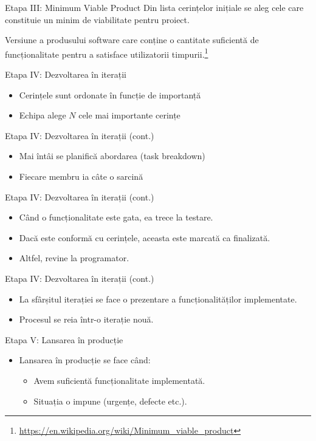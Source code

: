 \documentclass[presentation]{beamer}
\begin{document}
\begin{frame}[label={sec:org1ee4aa5}]{Etapa III: Minimum Viable Product}
Din lista cerințelor inițiale se aleg cele care constituie un minim de viabilitate pentru proiect.
\begin{definition}
Versiune a produsului software care conține o cantitate suficientă de funcționalitate pentru a satisface utilizatorii timpurii.\footnote{\url{https://en.wikipedia.org/wiki/Minimum\_viable\_product}}
\end{definition}
\end{frame}
\begin{frame}[label={sec:org7b1ed11}]{Etapa IV: Dezvoltarea în iterații}
\begin{itemize}
\item Cerințele sunt ordonate în funcție de importanță
\item Echipa alege \(N\) cele mai importante cerințe
\end{itemize}
\end{frame}
\begin{frame}[label={sec:org62a3eb6}]{Etapa IV: Dezvoltarea în iterații (cont.)}
\begin{itemize}
\item Mai întâi se planifică abordarea (task breakdown)
\item Fiecare membru ia câte o sarcină
\end{itemize}
\end{frame}
\begin{frame}[label={sec:orgff76f06}]{Etapa IV: Dezvoltarea în iterații (cont.)}
\begin{itemize}
\item Când o funcționalitate este gata, ea trece la testare.
\item Dacă este conformă cu cerințele, aceasta este marcată ca finalizată.
\item Altfel, revine la programator.
\end{itemize}
\end{frame}
\begin{frame}[label={sec:org2d982fe}]{Etapa IV: Dezvoltarea în iterații (cont.)}
\begin{itemize}
\item La sfârșitul iterației se face o prezentare a funcționalităților implementate.
\item Procesul se reia într-o iterație nouă.
\end{itemize}
\end{frame}
\begin{frame}[label={sec:orgc3d7a6c}]{Etapa V: Lansarea în producție}
\begin{itemize}
\item Lansarea în producție se face când:
\begin{itemize}
\item Avem suficientă funcționalitate implementată.
\item Situația o impune (urgențe, defecte etc.).
\end{itemize}
\end{itemize}
\end{frame}
\end{document}
